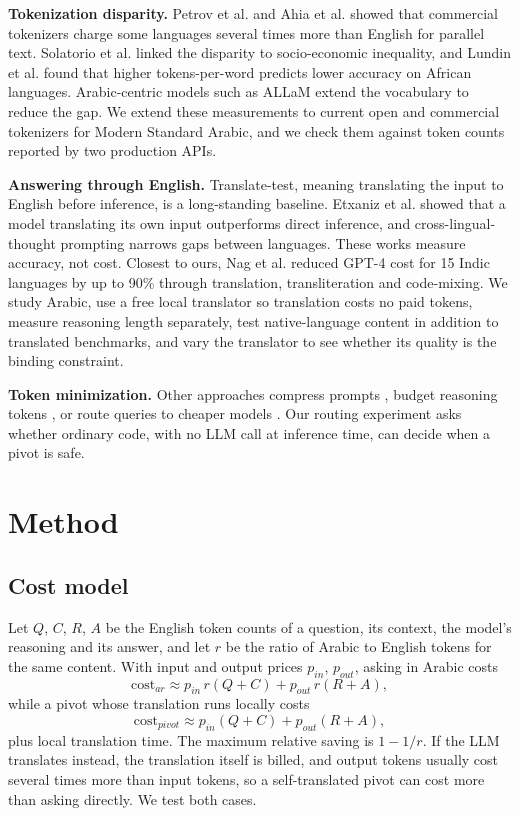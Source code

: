 \documentclass[conference,a4paper]{IEEEtran}
\begin{document}
\textbf{Tokenization disparity.} Petrov et al. \cite{petrov} and Ahia et al.
\cite{ahia} showed that commercial tokenizers charge some languages several
times more than English for parallel text. Solatorio et al. \cite{solatorio}
linked the disparity to socio-economic inequality, and Lundin et al.
\cite{lundin} found that higher tokens-per-word predicts lower accuracy on
African languages. Arabic-centric models such as ALLaM \cite{allam} extend the
vocabulary to reduce the gap. We extend these measurements to current open and
commercial tokenizers for Modern Standard Arabic, and we check them against
token counts reported by two production APIs.

\textbf{Answering through English.} Translate-test, meaning translating the
input to English before inference, is a long-standing baseline. Etxaniz et al.
\cite{etxaniz} showed that a model translating its own input outperforms direct
inference, and cross-lingual-thought prompting \cite{huang} narrows gaps
between languages. These works measure accuracy, not cost. Closest to ours, Nag
et al. \cite{nag} reduced GPT-4 cost for 15 Indic languages by up to 90\%
through translation, transliteration and code-mixing. We study Arabic, use a
free local translator so translation costs no paid tokens, measure reasoning
length separately, test native-language content in addition to translated
benchmarks, and vary the translator to see whether its quality is the binding
constraint.

\textbf{Token minimization.} Other approaches compress prompts \cite{lingua},
budget reasoning tokens \cite{tokenbudget}, or route queries to cheaper models
\cite{frugal, routellm}. Our routing experiment asks whether ordinary code,
with no LLM call at inference time, can decide when a pivot is safe.

\section{Method}

\subsection{Cost model}

Let $Q$, $C$, $R$, $A$ be the English token counts of a question, its context,
the model's reasoning and its answer, and let $r$ be the ratio of Arabic to
English tokens for the same content. With input and output prices $p_{in}$,
$p_{out}$, asking in Arabic costs
\begin{equation}
\mathrm{cost}_{ar} \approx p_{in}\,r(Q+C) + p_{out}\,r(R+A),
\end{equation}
while a pivot whose translation runs locally costs
\begin{equation}
\mathrm{cost}_{pivot} \approx p_{in}(Q+C) + p_{out}(R+A),
\end{equation}
plus local translation time. The maximum relative saving is $1 - 1/r$. If the
LLM translates instead, the translation itself is billed, and output tokens
usually cost several times more than input tokens, so a self-translated pivot
can cost more than asking directly. We test both cases.
\end{document}
